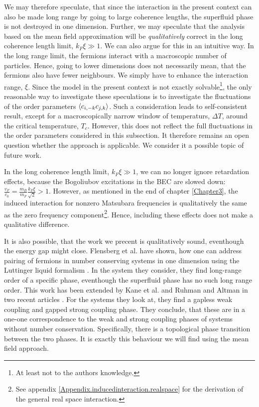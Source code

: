 We may therefore speculate, that since the interaction in the present context can also be made long range by going to large coherence lengths, the superfluid phase is not destroyed in one dimension. Further, we may speculate that the analysis based on the mean field approximation will be \textit{qualitatively} correct in the long coherence length limit, $k_F\xi \gg 1$. We can also argue for this in an intuitive way. In the long range limit, the fermions interact with a macroscopic number of particles. Hence, going to lower dimensions does not necessarily mean, that the fermions also have fewer neighbours. We simply have to enhance the interaction range, $\xi$. Since the model in the present context is not exactly solvable\footnote{At least not to the authors knowledge.}, the only reasonable way to investigate these speculations is to investigate the fluctuations of the order parameters $\braket{c_{i,-k}c_{j,k}}$. Such a consideration leads to self-consistent result, except for a macroscopically narrow window of temperaturs, $\Delta T$, around the critical temperature, $T_c$. However, this does not reflect the full fluctuations in the order parameters considered in this subsection. It therefore remains an open question whether the approach is applicable. We consider it a possible topic of future work. 

In the long coherence length limit, $k_F\xi \gg 1$, we can no longer ignore retardation effects, because the Bogoliubov excitations in the BEC are slowed down: $\frac{v_F}{c_0} = \frac{m_B}{m_F}\frac{k_F\xi}{\sqrt{2}} > 1$. However, as mentioned in the end of chapter \ref{Chapter3}, the induced interaction for nonzero Matsubara frequencies is qualitatively the same as the zero frequency component\footnote{See appendix \ref{Appendix.inducedinteraction.realspace} for the derivation of the general real space interaction.}. Hence, including these effects does not make a qualitative difference.

It is also possible, that the work we precent is qualitatively sound, eventhough the energy gap might close. Flensberg et al. have shown, how one can address pairing of fermions in number conserving systems in one dimension using the Luttinger liquid formalism \cite{Flensberg.numberconserving1Dfermions}. In the system they consider, they find long-range order of a specific phase, eventhough the superfluid phase has no such long range order. This work has been extended by Kane et al. and Ruhman and Altman in two recent articles \cite{Kane.Pairing.Luttingerliquids, Altman.Pairing.spinlessfermions}. For the systems they look at, they find a gapless weak coupling and gapped strong coupling phase. They conclude, that these are in a one-one correspondence to the weak and strong coupling phases of systems without number conservation. Specifically, there is a topological phase transition between the two phases. It is exactly this behaviour we will find using the mean field approach.

